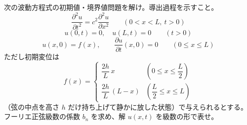 
次の波動方程式の初期値・境界値問題を解け。導出過程を示すこと。
\[
\frac{\partial^{2} u}{\partial t^{2}} = c^{2}\frac{\partial^{2} u}{\partial x^{2}} \qquad (0 < x < L,\ t > 0)
\]
\[
u(0,t) = 0,\quad u(L,t) = 0 \qquad (t > 0)
\]
\[
u(x,0) = f(x), \qquad \frac{\partial u}{\partial t}(x,0) = 0 \qquad (0 \le x \le L)
\]
ただし初期変位は
\[
f(x) =
\begin{cases}
\dfrac{2h}{L}\,x & \left(0 \le x \le \dfrac{L}{2}\right) \\[2mm]
\dfrac{2h}{L}\,(L-x) & \left(\dfrac{L}{2} \le x \le L\right)
\end{cases}
\]
（弦の中点を高さ $h$ だけ持ち上げて静かに放した状態）で与えられるとする。フーリエ正弦級数の係数 $b_{n}$ を求め、解 $u(x,t)$ を級数の形で表せ。

